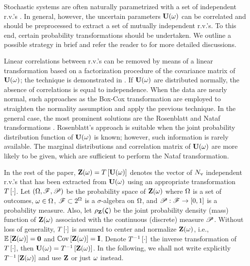 Stochastic systems are often naturally parametrized with a set of independent r.v.'s \cite{xiu2009}. In general, however, the uncertain parameters $\mathbf{U}(\omega)$ can be correlated and should be preprocessed to extract a set of mutually independent r.v.'s. To this end, certain probability transformations should be undertaken. We outline a possible strategy in brief and refer the reader to \cite{eldred2009, xiu2009} for more detailed discussions.

Linear correlations between r.v.'s can be removed by means of a linear transformation based on a factorization procedure of the covariance matrix of $\mathbf{U}(\omega)$; the technique is demonstrated in . If $\mathbf{U}(\omega)$ are distributed normally, the absence of correlations is equal to independence. When the data are nearly normal, such approaches as the Box-Cox transformation are employed to straighten the normality assumption and apply the previous technique. In the general case, the most prominent solutions are the Rosenblatt and Nataf transformations \cite{eldred2009}. Rosenblatt's approach is suitable when the joint probability distribution function of $\mathbf{U}(\omega)$ is known; however, such information is rarely available. The marginal distributions and correlation matrix of $\mathbf{U}(\omega)$ are more likely to be given, which are sufficient to perform the Nataf transformation.

In the rest of the paper, $\mathbf{Z}(\omega) = T\left[\mathbf{U}(\omega)\right]$ denotes the vector of ${N_\text{v}}$ independent r.v.'s that has been extracted from $\mathbf{U}(\omega)$ using an appropriate transformation $T\left[\cdot\right]$. Let $(\Omega, \mathscr{F}, \mathscr{P})$ be the probability space \cite{durrett2010} of $\mathbf{Z}(\omega)$ where $\Omega$ is a set of outcomes, $\omega \in \Omega$, $\mathscr{F} \subset 2^\Omega$ is a $\sigma$-algebra on $\Omega$, and $\mathscr{P}: \mathscr{F} \to [0, 1]$ is a probability measure. Also, let $\rho_{\mathbf{Z}}(\boldsymbol{\zeta})$ be the joint probability density (mass) function of $\mathbf{Z}(\omega)$ associated with the continuous (discrete) measure $\mathscr{P}$. Without loss of generality, $T\left[\cdot\right]$ is assumed to center and normalize $\mathbf{Z}(\omega)$, i.e., $\oExp{\vZ(\o)} = \mZero$ and $\oCov{\vZ(\o)} = \mI$. Denote $T^{-1}\left[\cdot\right]$ the inverse transformation of $T\left[\cdot\right]$, then $\mathbf{U}(\omega) = T^{-1}\left[\mathbf{Z}(\omega)\right]$. In the following, we shall not write explicitly $T^{-1}\left[\mathbf{Z}(\omega)\right]$ and use $\mathbf{Z}$ or just $\omega$ instead.
